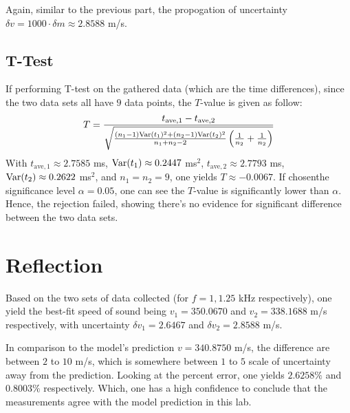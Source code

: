 \documentclass{article}
\begin{document}
Again, similar to the previous part, the propogation of uncertainty $\delta v = 1000\cdot \delta m \approx 2.8588$ m/s.

\hfil

\subsection{T-Test}
If performing T-test on the gathered data (which are the time differences), since the two data sets all have $9$ data points, the $T$-value is given as follow:
\begin{align}
    T = \frac{t_{\text{ave},1}-t_{\text{ave},2}}{\sqrt{\frac{(n_1-1)\mathrm{Var}(t_1)^2+(n_2-1)\mathrm{Var}(t_2)^2}{n_1+n_2-2}\left(\frac{1}{n_2}+\frac{1}{n_2}\right)}}
\end{align}
With $t_{\text{ave},1}\approx 2.7585$ ms, $\mathrm{Var}(t_1)\approx 0.2447$ ms$^2$, $t_{\text{ave},2}\approx 2.7793$ ms, $\mathrm{Var}(t_2)\approx 0.2622$ ms$^2$, and $n_1=n_2=9$, one yields $T \approx -0.0067$. If chosenthe significance level $\alpha=0.05$, one can see the $T$-value is significantly lower than $\alpha$. Hence, the rejection failed, showing there's no evidence for significant difference between the two data sets.

\newpage

\section{Reflection}
Based on the two sets of data collected (for $f=1, 1.25$ kHz respectively), one yield the best-fit speed of sound being $v_1=350.0670$ and $v_2=338.1688$ m/s respectively, with uncertainty $\delta v_1 =2.6467$ and $\delta v_2 = 2.8588$ m/s.

In comparison to the model's prediction $v = 340.8750$ m/s, the difference are between $2$ to $10$ m/s, which is somewhere between $1$ to $5$ scale of uncertainty away from the prediction. Looking at the percent error, one yields $2.6258\%$ and $0.8003\%$ respectively. Which, one has a high confidence to conclude that the measurements agree with the model prediction in this lab.

\hfil
\end{document}
